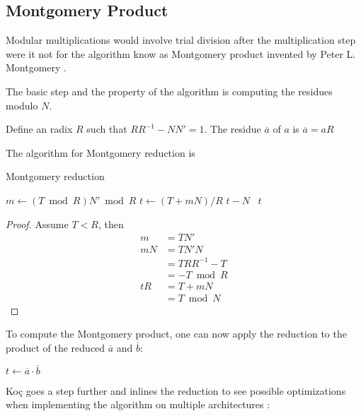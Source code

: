 \subsection{Montgomery Product}

Modular multiplications would involve trial division after the
multiplication step were it not for the algorithm know as Montgomery
product invented by Peter L. Montgomery \cite{Montgomery}.

The basic step and the property of the algorithm is computing the
residues modulo $N$.

\begin{defn}
  Define an radix $R$ such that $R R^{-1} - N N' = 1$. The residue
  $\overline{a}$ of $a$ is $\overline{a} = a R$
\end{defn}

\begin{thm}
  The algorithm for Montgomery reduction is
  \begin{algorithm}[hbt!]
    \caption{Montgomery reduction}
    \begin{algorithmic}
      \State $m \gets (T \bmod{R}) N' \bmod{R}$
      \State $t \gets (T + m N)/R$
       \Return $t - N$
      \Else \, \Return $t$
      \EndIf
      \EndFunction
    \end{algorithmic}
  \end{algorithm}
\end{thm}
\begin{proof}
  Assume $T < R$, then
  \begin{align*}
      m & = T N' \\
    m N & = T N' N \\
        & = T R R^{-1} - T \\
        & = - T \bmod{R} \\
    t R & = T + m N \\
        & = T \bmod{N}
  \end{align*}
\end{proof}

To compute the Montgomery product, one can now apply the reduction to
the product of the reduced $\overline{a}$ and $\overline{b}$:
\begin{algorithmic}
    \State $t \gets \overline{a} \cdot \overline{b}$
    \State \Return {}
  \EndFunction
\end{algorithmic}

Ko\c{c} goes a step further and inlines the reduction to see possible
optimizations when implementing the algorithm on multiple
architectures \cite{Koc}:

